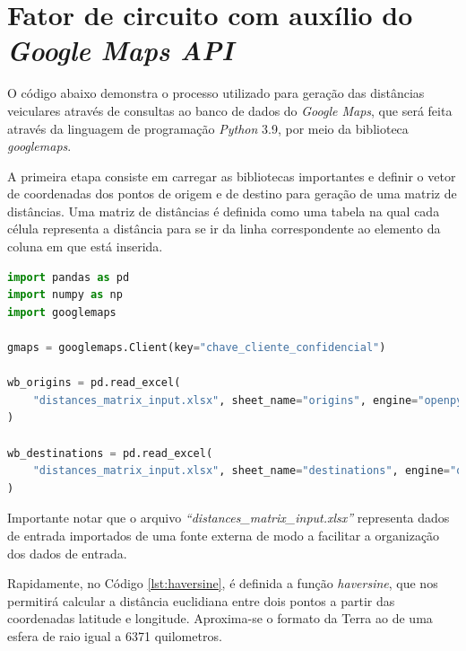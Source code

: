 \section{Fator de circuito com auxílio do \textit{Google Maps API}}
%
O código abaixo demonstra o processo utilizado para geração das distâncias veiculares através de consultas ao banco de dados do \textit{Google Maps}, que será feita através da linguagem de programação \textit{Python} 3.9, por meio da biblioteca \textit{googlemaps}.
%

A primeira etapa consiste em carregar as bibliotecas importantes e definir o vetor de coordenadas dos pontos de origem e de destino para geração de uma matriz de distâncias. 
Uma matriz de distâncias é definida como uma tabela na qual cada célula representa a distância para se ir da linha correspondente ao elemento da coluna em que está inserida.

\begin{lstlisting}[language=Python, label={lst:teste}, caption={\small Carregando origens e destinos para a matriz de distâncias \normalsize}]
import pandas as pd
import numpy as np
import googlemaps 

gmaps = googlemaps.Client(key="chave_cliente_confidencial")

wb_origins = pd.read_excel(
    "distances_matrix_input.xlsx", sheet_name="origins", engine="openpyxl"
)

wb_destinations = pd.read_excel(
    "distances_matrix_input.xlsx", sheet_name="destinations", engine="openpyxl"
)
\end{lstlisting}

Importante notar que o arquivo \textit{``distances\_matrix\_input.xlsx''} representa dados de entrada importados de uma fonte externa de modo a facilitar a organização dos dados de entrada.

Rapidamente, no Código \ref{lst:haversine}, é definida a função \textit{haversine}, que nos permitirá calcular a distância euclidiana entre dois pontos a partir das coordenadas latitude e longitude. Aproxima-se o formato da Terra ao de uma esfera de raio igual a 6371 quilometros.

